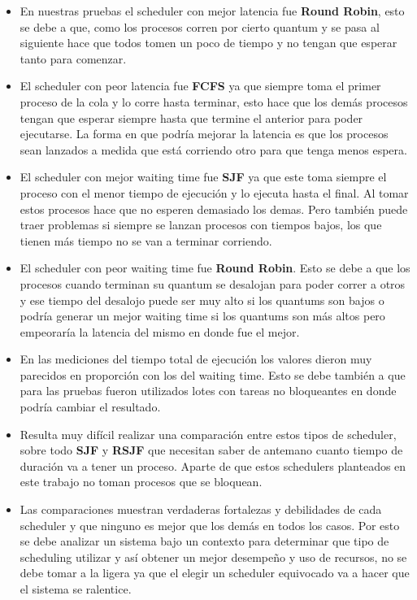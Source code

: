 \begin{itemize}

\item En nuestras pruebas el scheduler con mejor latencia fue \textbf{Round Robin}, esto se debe a que, como los procesos corren por cierto quantum y se pasa al siguiente hace que todos tomen un poco de tiempo y no tengan que esperar tanto para comenzar.

\item El scheduler con peor latencia fue \textbf{FCFS} ya que siempre toma el primer proceso de la cola y lo corre hasta terminar, esto hace que los demás procesos tengan que esperar siempre hasta que termine el anterior para poder ejecutarse. La forma en que podría mejorar la latencia es que los procesos sean lanzados a medida que está corriendo otro para que tenga menos espera.

\item El scheduler con mejor waiting time fue \textbf{SJF} ya que este toma siempre el proceso con el menor tiempo de ejecución y lo ejecuta hasta el final. Al tomar estos procesos hace que no esperen demasiado los demas. Pero también puede traer problemas si siempre se lanzan procesos con tiempos bajos, los que tienen más tiempo no se van a terminar corriendo.

\item El scheduler con peor waiting time fue \textbf{Round Robin}. Esto se debe a que los procesos cuando terminan su quantum se desalojan para poder correr a otros y ese tiempo del desalojo puede ser muy alto si los quantums son bajos o podría generar un mejor waiting time si los quantums son más altos pero empeoraría la latencia del mismo en donde fue el mejor.

\item En las mediciones del tiempo total de ejecución los valores dieron muy parecidos en proporción con los del waiting time. Esto se debe también a que para las pruebas fueron utilizados lotes con tareas no bloqueantes en donde podría cambiar el resultado.

\item Resulta muy difícil realizar una comparación entre estos tipos de scheduler, sobre todo \textbf{SJF} y \textbf{RSJF} que necesitan saber de antemano cuanto tiempo de duración va a tener un proceso. Aparte de que estos schedulers planteados en este trabajo no toman procesos que se bloquean.

\item Las comparaciones muestran verdaderas fortalezas y debilidades de cada scheduler y que ninguno es mejor que los demás en todos los casos. Por esto se debe analizar un sistema bajo un contexto para determinar que tipo de scheduling utilizar y así obtener un mejor desempeño y uso de recursos, no se debe tomar a la ligera ya que el elegir un scheduler equivocado va a hacer que el sistema se ralentice.

\end{itemize}
